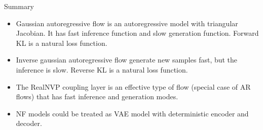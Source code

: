 \begin{frame}{Summary}
	\begin{itemize}
		\item Gaussian autoregressive flow is an autoregressive model with triangular Jacobian. It has fast inference function and slow generation function. Forward KL is a natural loss function.
		\vfill
		\item Inverse gaussian autoregressive flow generate new samples fast, but the inference is slow. Reverse KL is a natural loss function.
		\vfill
		\item The RealNVP coupling layer is an effective type of flow (special case of AR flows) that has fast inference and generation modes.
		\vfill
		\item NF models could be treated as VAE model with deterministic encoder and decoder.
	\end{itemize}
\end{frame}
 
